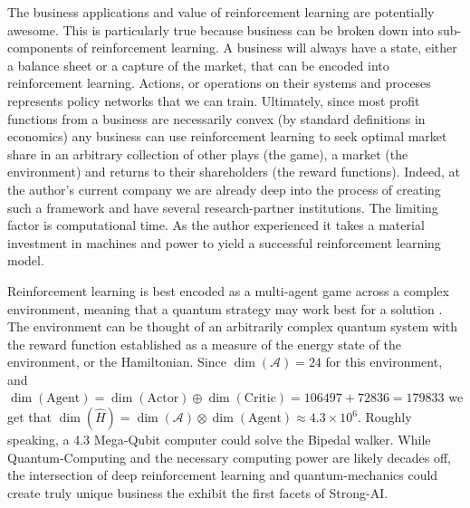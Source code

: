 \documentclass[doc, onecolumn, 12pt]{apa6}
\begin{document}
The business applications and value of reinforcement learning are potentially awesome. This is particularly true because business can be broken down into sub-components of reinforcement learning. A business will always have a state, either a balance sheet or a capture of the market, that can be encoded into reinforcement learning. Actions, or operations on their systems and proceses represents policy networks that we can train. Ultimately, since most profit functions from a business are necessarily convex (by standard definitions in economics) any business can use reinforcement learning to seek optimal market share in an arbitrary collection of other plays (the game), a market (the environment) and returns to their shareholders (the reward functions). Indeed, at the author's current company  we are already deep into the process of creating such a framework and have several research-partner institutions. The limiting factor is computational time. As the author experienced it takes a material investment in machines and power to yield a successful reinforcement learning model. 

Reinforcement learning is best encoded as a multi-agent game across a complex environment, meaning that a quantum strategy may work best for a solution \citep{Meyer:1999vs, Guo:2008kd}. The environment can be thought of an arbitrarily complex quantum system with the reward function established as a measure of the energy state of the environment, or the Hamiltonian. Since $\dim(\mathcal{A})=24$ for this environment, and $\dim(\text{Agent}) = \dim(\text{Actor}) \oplus \dim(\text{Critic}) = 106497 + 72836 = 179833$ we get that $\dim(\hat{H}) = \dim(\mathcal{A}) \otimes \dim(\text{Agent})  \approx 4.3 \times 10 ^{6}$. Roughly speaking, a 4.3 Mega-Qubit computer could solve the Bipedal walker. While Quantum-Computing and the necessary computing power are likely decades off, the intersection of deep reinforcement learning and quantum-mechanics could create truly unique business the exhibit the first facets of Strong-AI. 



\newpage

\cite{*}

\end{document}
